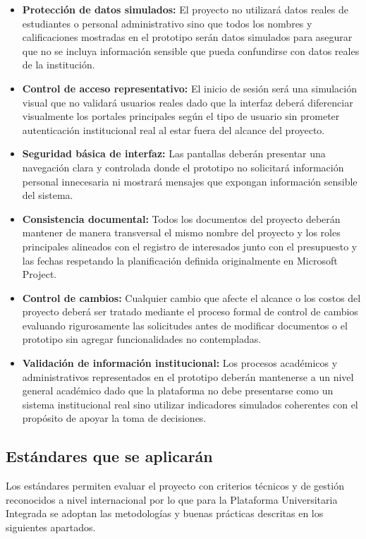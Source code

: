 \documentclass[11pt,spanish]{article}
\begin{document}
\begin{itemize}
    \item \textbf{Protección de datos simulados:} El proyecto no utilizará datos reales de estudiantes o personal administrativo sino que todos los nombres y calificaciones mostradas en el prototipo serán datos simulados para asegurar que no se incluya información sensible que pueda confundirse con datos reales de la institución.
    \item \textbf{Control de acceso representativo:} El inicio de sesión será una simulación visual que no validará usuarios reales dado que la interfaz deberá diferenciar visualmente los portales principales según el tipo de usuario sin prometer autenticación institucional real al estar fuera del alcance del proyecto.
    \item \textbf{Seguridad básica de interfaz:} Las pantallas deberán presentar una navegación clara y controlada donde el prototipo no solicitará información personal innecesaria ni mostrará mensajes que expongan información sensible del sistema.
    \item \textbf{Consistencia documental:} Todos los documentos del proyecto deberán mantener de manera transversal el mismo nombre del proyecto y los roles principales alineados con el registro de interesados junto con el presupuesto y las fechas respetando la planificación definida originalmente en Microsoft Project.
    \item \textbf{Control de cambios:} Cualquier cambio que afecte el alcance o los costos del proyecto deberá ser tratado mediante el proceso formal de control de cambios evaluando rigurosamente las solicitudes antes de modificar documentos o el prototipo sin agregar funcionalidades no contempladas.
    \item \textbf{Validación de información institucional:} Los procesos académicos y administrativos representados en el prototipo deberán mantenerse a un nivel general académico dado que la plataforma no debe presentarse como un sistema institucional real sino utilizar indicadores simulados coherentes con el propósito de apoyar la toma de decisiones.
\end{itemize}

\subsection{Estándares que se aplicarán}

Los estándares permiten evaluar el proyecto con criterios técnicos y de gestión reconocidos a nivel internacional por lo que para la Plataforma Universitaria Integrada se adoptan las metodologías y buenas prácticas descritas en los siguientes apartados.
\end{document}
